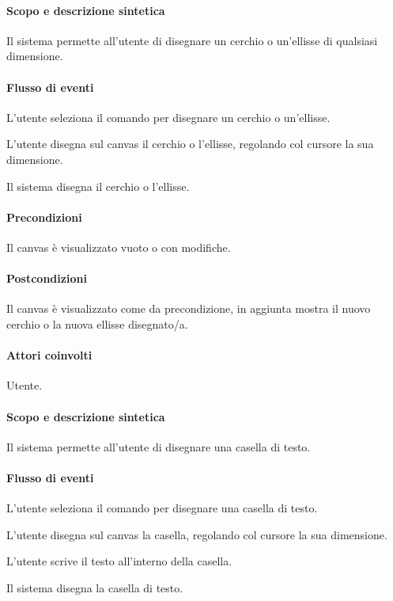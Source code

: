 \paragraph{Scopo e descrizione sintetica} 
Il sistema permette all'utente di disegnare un cerchio o un'ellisse di qualsiasi dimensione.
\paragraph{Flusso di eventi}
\begin{elenconumerato}[\textbf{}]{\subsubsecindent}
\item L'utente seleziona il comando per disegnare un cerchio o un'ellisse.
\item L'utente disegna sul canvas il cerchio o l'ellisse, regolando col cursore la sua dimensione.
\item Il sistema disegna il cerchio o l'ellisse.
\end{elenconumerato}
\paragraph{Precondizioni} Il canvas \`e visualizzato vuoto o con modifiche.
\paragraph{Postcondizioni} Il canvas \`e visualizzato come da precondizione, in aggiunta mostra il nuovo cerchio o la nuova ellisse disegnato/a.

\paragraph{Attori coinvolti} Utente.
\paragraph{Scopo e descrizione sintetica} 
Il sistema permette all'utente di disegnare una casella di testo.
\paragraph{Flusso di eventi}
\begin{elenconumerato}[\textbf{}]{\subsubsecindent}
\item L'utente seleziona il comando per disegnare una casella di testo.
\item L'utente disegna sul canvas la casella, regolando col cursore la sua dimensione.
\item L'utente scrive il testo all'interno della casella.
\item Il sistema disegna la casella di testo.
\end{elenconumerato}
